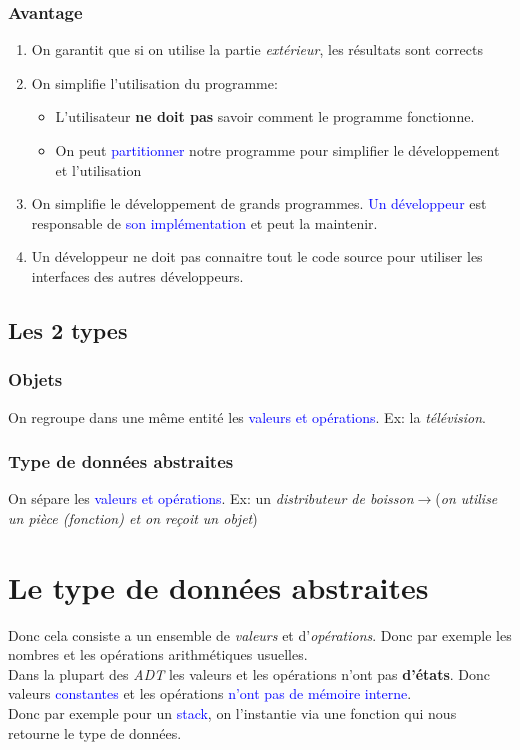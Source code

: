 \documentclass{report}
\begin{document}
\subsubsection{Avantage}
\begin{enumerate}
\item On garantit que si on utilise la partie \textit{extérieur}, les résultats sont corrects
\item On simplifie l'utilisation du programme:
	\begin{itemize}
	\item L'utilisateur \textbf{ne doit pas} savoir comment le programme fonctionne.
	\item On peut \textcolor{blue}{partitionner} notre programme pour simplifier le développement et l'utilisation
	\end{itemize}
\item On simplifie le développement de grands programmes. \textcolor{blue}{Un développeur} est responsable de \textcolor{blue}{son implémentation} et peut la maintenir.
\item Un développeur ne doit pas connaitre tout le code source pour utiliser les interfaces des autres développeurs.
\end{enumerate}

\subsection{Les 2 types}

\subsubsection{Objets}
On regroupe dans une même entité les \textcolor{blue}{valeurs et opérations}. Ex: la \textit{télévision}.

\subsubsection{Type de données abstraites}
On sépare les \textcolor{blue}{valeurs et opérations}. Ex: un \textit{distributeur de boisson}$\rightarrow$(\textit{on utilise un pièce (fonction) et on reçoit un objet})

\section{Le type de données abstraites}
Donc cela consiste a un ensemble de \textit{valeurs} et d'\textit{opérations}. Donc par exemple les nombres et les opérations arithmétiques usuelles.\\
Dans la plupart des \textit{ADT} les valeurs et les opérations n'ont pas \textbf{d'états}. Donc valeurs \textcolor{blue}{constantes} et les opérations \textcolor{blue}{n'ont pas de mémoire interne}.\\
Donc par exemple pour un \textcolor{blue}{stack}, on l'instantie via une fonction qui nous retourne le type de données.\\
\end{document}
